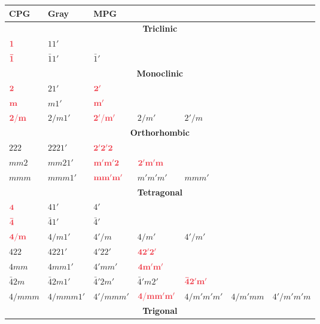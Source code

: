\begin{table}[t!]
\leavevmode\centering
{\footnotesize
\begin{tabular}{|l|l|lllll|}
\hline
CPG & Gray & \multicolumn{5}{l|}{MPG}\\
\hline\hline
\multicolumn{7}{|c|}{\textbf{Triclinic}}\\
\hline 
${\color{OCScotsRose}\mathbf{1}}$ & $11'$ & & & & & \\
${\color{OCScotsRose}\mathbf{\bar{1}}}$ &$\bar{1}1'$ & $\bar{1}'$ & & & & \\
\hline
\multicolumn{7}{|c|}{\textbf{Monoclinic}}\\
\hline 
${\color{OCScotsRose}\mathbf{2}}$ &  $21'$ & ${\color{OCScotsRose}\mathbf{2'}}$ & & & & \\
${\color{OCScotsRose}\mathbf{m}}$ & $m1'$ &${\color{OCScotsRose}\mathbf{m'}}$ & & & & \\
${\color{OCScotsRose}\mathbf{2/m}}$  & $2/m1'$  &${\color{OCScotsRose}\mathbf{2'/m'}}$ & $2/m'$ & $2'/m$ & & \\
\hline
\multicolumn{7}{|c|}{\textbf{Orthorhombic}}\\
\hline 
$222$  & $2221'$  & ${\color{OCScotsRose}\mathbf{2'2'2}}$ & & & & \\
$mm2$  & $mm21'$  & ${\color{OCScotsRose}\mathbf{m'm'2}}$ & ${\color{OCScotsRose}\mathbf{2'm'm}}$ & & & \\
$mmm$  & $mmm1'$  & ${\color{OCScotsRose}\mathbf{mm'm'}}$ & $m'm'm'$ & $mmm'$ & & \\
\hline
\multicolumn{7}{|c|}{\textbf{Tetragonal}}\\
\hline 
${\color{OCScotsRose}\mathbf{4}}$  & $41'$  & $4'$ & & & & \\
${\color{OCScotsRose}\mathbf{\bar{4}}}$  & $\bar{4}1'$  & $\bar{4}'$ & & & & \\
${\color{OCScotsRose}\mathbf{4/m}}$  & $4/m1'$  &$4'/m$ &$4/m'$ & $4'/m'$ & & \\
$422$ & $4221'$ & $4'22'$ & ${\color{OCScotsRose}\mathbf{42'2'}}$ & & & \\
$4mm$ & $4mm1'$ & $4'mm'$  & ${\color{OCScotsRose}\mathbf{4m'm'}}$ & & & \\
$\bar{4}2m$ & $\bar{4}2m1'$ & $\bar{4}'2m'$ & $\bar{4}'m2'$ & ${\color{OCScotsRose}\mathbf{\bar{4}2'm'}}$ & & \\
$4/mmm$  & $4/mmm1'$  & $4'/mmm'$ &${\color{OCScotsRose}\mathbf{4/mm'm'}}$ & $4/m'm'm'$ & $4/m'mm$ & $4'/m'm'm$ \\
\hline
\multicolumn{7}{|c|}{\textbf{Trigonal}}\\

\end{tabular}}
\end{table}
